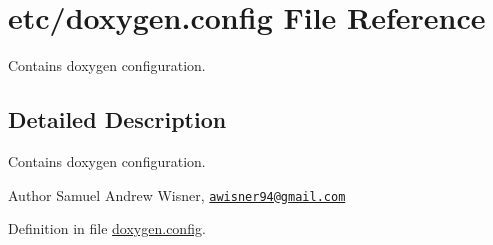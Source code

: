 \hypertarget{doxygen_8config}{\section{etc/doxygen.config File Reference}
\label{doxygen_8config}
}


Contains doxygen configuration.  




\subsection{Detailed Description}
Contains doxygen configuration. 

\begin{DoxyAuthor}{Author}
Samuel Andrew Wisner, \href{mailto:awisner94@gmail.com}{\tt awisner94@gmail.\+com} 
\end{DoxyAuthor}


Definition in file \hyperlink{doxygen_8config_source}{doxygen.\+config}.


